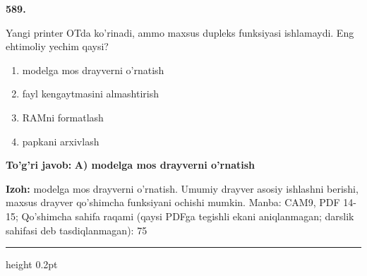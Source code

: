 \documentclass[10pt,a4paper]{article}
\begin{document}
{\bfseries\sffamily\color{ink} 589.}
\par
Yangi printer OTda ko'rinadi, ammo maxsus dupleks funksiyasi ishlamaydi. Eng ehtimoliy yechim qaysi?
\begin{enumerate}[label=\Alph*),leftmargin=9mm]
\item modelga mos drayverni o'rnatish
\item fayl kengaytmasini almashtirish
\item RAMni formatlash
\item papkani arxivlash
\end{enumerate}
\begin{tcolorbox}[enhanced,breakable,colback=teal!4,colframe=teal!60!black,boxrule=0.45pt,arc=1.2mm,left=2.7mm,right=2.7mm,top=1.8mm,bottom=1.8mm,before skip=2mm,after skip=2mm]
{\bfseries\sffamily\color{teal}To'g'ri javob:} \textbf{A) modelga mos drayverni o'rnatish}
\par\smallskip
{\bfseries Izoh:} modelga mos drayverni o'rnatish. Umumiy drayver asosiy ishlashni berishi, maxsus drayver qo'shimcha funksiyani ochishi mumkin. Manba: CAM9, PDF 14-15; Qo'shimcha sahifa raqami (qaysi PDFga tegishli ekani aniqlanmagan; darslik sahifasi deb tasdiqlanmagan): 75
\end{tcolorbox}
\vspace{2mm}\hrule height 0.2pt\vspace{3mm}
\end{document}
